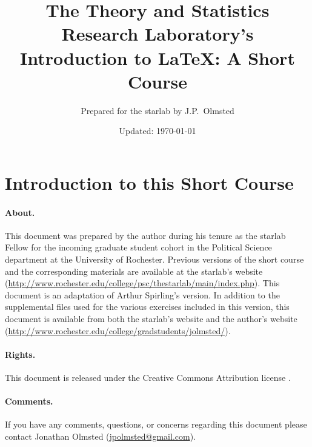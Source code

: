 \documentclass[10pt,letterpaper]{article}
\author{Prepared for the starlab by J.P.\ Olmsted}
\title{The Theory and Statistics Research
  Laboratory's Introduction to \LaTeX{}: A Short Course}
\date{Updated: \today}
\begin{document}
\begin{titlepage}
\maketitle 
\tableofcontents
\end{titlepage}

\section*{Introduction to this Short Course}

\paragraph{About.}This document was prepared by the author during his tenure as the
starlab Fellow for the incoming graduate student cohort in the
Political Science department at the University of Rochester. Previous
versions of the short course and the corresponding materials are
available at the starlab's website
(\url{http://www.rochester.edu/college/psc/thestarlab/main/index.php}). This
document is an adaptation of Arthur Spirling's version. In addition to
the supplemental files used for the various exercises included in this
version, this document is available from both the starlab's website
and the author's website
(\url{http://www.rochester.edu/college/gradstudents/jolmsted/}).

\paragraph{Rights.}This document is released under the Creative
Commons Attribution license \by.

\paragraph{Comments.}If you have any comments, questions, or concerns
regarding this document please contact Jonathan Olmsted
(\url{jpolmsted@gmail.com}).

\pagebreak

 

\clearpage
\pagebreak



\clearpage
\pagebreak



\clearpage
\pagebreak



\clearpage
\pagebreak



\clearpage



\end{document}
